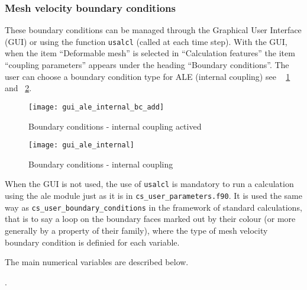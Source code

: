 \subsubsection{Mesh velocity boundary conditions}
These boundary conditions can be managed through the Graphical User Interface (GUI)
 or using the function \texttt{usalcl} (called at each time step). With the GUI,
 when the item ``Deformable mesh'' is selected in ``Calculation features''
 the item ``coupling parameters'' appears under the heading ``Boundary conditions''.
 The user can choose a boundary condition type for ALE (internal coupling) see \figurename~
 \ref{fig:CL-ale1} and \figurename~\ref{fig:CL-ale2}.


\begin{figure}[ht]
\begin{center}
\texttt{[image: gui\_ale\_internal\_bc\_add]}
\caption{Boundary conditions - internal coupling actived}
\label{fig:CL-ale1}
\end{center}
\end{figure}

\begin{figure}[ht]
\begin{center}
\texttt{[image: gui\_ale\_internal]}
\caption{Boundary conditions - internal coupling}
\label{fig:CL-ale2}
\end{center}
\end{figure}

When the GUI is not used, the use of \texttt{usalcl} is mandatory to run
a calculation using
the ale module just as it is in \texttt{cs\_user\_parameters.f90}. It is used the same way as
\texttt{cs\_user\_boundary\_conditions} in the framework of
standard calculations, that is to say a loop on the boundary faces
marked out by their colour (or more generally by a property of their
family), where the type of mesh velocity boundary condition is definied for
each variable.

The main numerical variables are described below.

.

